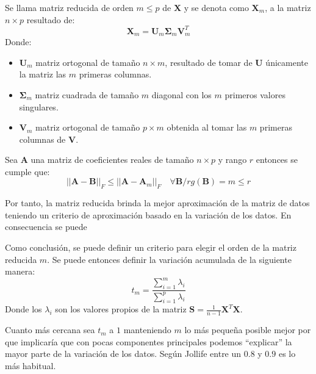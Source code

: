 \begin{defi}
Se llama matriz reducida de orden $m\leq p$ de $\textbf{X}$ y se denota como $\textbf{X}_m$, a la matriz $n\times p$ resultado de:
\begin{equation}
\textbf{X}_m=\textbf{U}_m\mathbf{\Sigma}_m\textbf{V}^T_m
\end{equation}
Donde:
\begin{itemize}
\item $\textbf{U}_m$ matriz ortogonal de tamaño $n \times m$, resultado de tomar de \textbf{U} únicamente la matriz las $m$ primeras columnas. 
\item $\mathbf{\Sigma}_m$  matriz cuadrada de tamaño $m$ diagonal con los $m$ primeros valores singulares. 
\item $\textbf{V}_m$ matriz ortogonal de tamaño $p \times m$ obtenida al tomar las $m$ primeras columnas de \textbf{V}.
\end{itemize}
\end{defi}

\begin{teorema}
Sea \textbf{A} una matriz de coeficientes reales de tamaño $n\times p$ y rango $r$  entonces se cumple que:
\begin{equation}
||\textbf{A}-\textbf{B}||_F\leq ||\textbf{A}-\textbf{A}_m||_F \quad \forall \textbf{B}/ rg(\textbf{B})=m \leq r
\end{equation} 
\end{teorema}

\noindent Por tanto, la matriz reducida brinda la mejor aproximación de la matriz de datos teniendo un criterio de aproximación basado en la variación de los datos. En consecuencia se puede 

\noindent Como conclusión, se puede definir un criterio para elegir el orden de la matriz reducida $m$. Se puede entonces definir la variación acumulada de la siguiente manera:
\begin{equation}
t_m=\dfrac{\sum_{i=1}^{m}\lambda_i}{\sum_{i=1}^{p}\lambda_i}
\end{equation}
\noindent Donde los $\lambda_i$ son los valores propios de la matriz $\textbf{S}=\frac{1}{n-1}\textbf{X}^T\textbf{X}$.

\noindent Cuanto más cercana sea $t_m$ a $1$ manteniendo $m$ lo más pequeña posible mejor por que implicaría que con pocas componentes principales podemos ``explicar'' la mayor parte de la variación de los datos. Según Jollife \cite{Jollife 1986} entre un $0.8$ y $0.9$ es lo más habitual. 